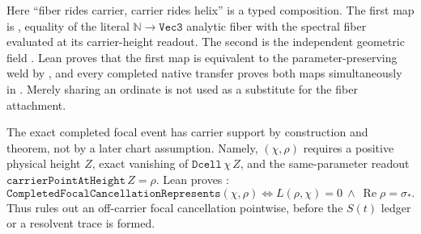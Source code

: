 \documentclass[11pt]{article}
\theoremstyle{definition}
\renewcommand{\Re}{\operatorname{Re}}
\begin{document}
Here ``fiber rides carrier, carrier rides helix'' is a typed composition.
The first map is
, equality of the literal
\(\mathbb N\to\texttt{Vec3}\) analytic fiber with the spectral fiber evaluated
at its carrier-height readout.  The second is the independent geometric field
.  Lean proves that the first map is
equivalent to the parameter-preserving weld by
, and every completed native transfer proves
both maps simultaneously in
.  Merely sharing an ordinate is not
used as a substitute for the fiber attachment.

The exact completed focal event has carrier support by construction and
theorem, not by a later chart assumption.  Namely,
$(\chi,\rho)$ requires a positive
physical height \(Z\), exact vanishing of \(\texttt{Dcell}\,\chi\,Z\), and the
same-parameter readout \(\texttt{carrierPointAtHeight}\,Z=\rho\).  Lean proves
:
\[
 \texttt{CompletedFocalCancellationRepresents}(\chi,\rho)
 \Longleftrightarrow L(\rho,\chi)=0\ \wedge\ \Re\rho=\sigma_*.
\]
Thus  rules out an
off-carrier focal cancellation pointwise, before the \(S(t)\) ledger or a
resolvent trace is formed.
\end{document}
